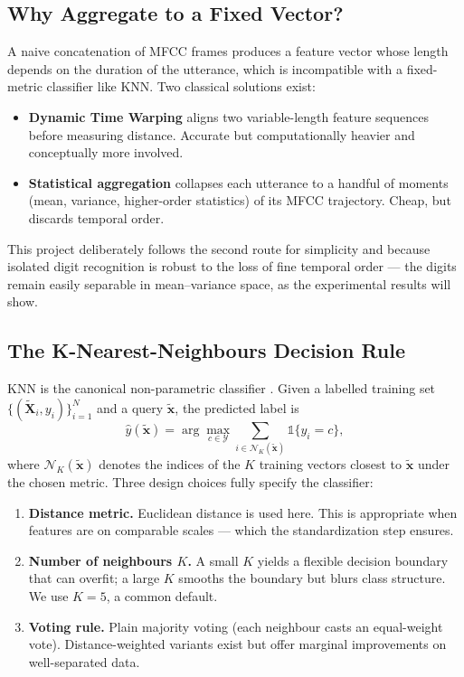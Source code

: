 \documentclass[12pt,a4paper]{article}
\begin{document}
\subsection{Why Aggregate to a Fixed Vector?}

A naive concatenation of MFCC frames produces a feature vector whose length
depends on the duration of the utterance, which is incompatible with a fixed-
metric classifier like KNN. Two classical solutions exist:
\begin{itemize}
    \item \textbf{Dynamic Time Warping} \cite{sakoe1978dynamic} aligns two
          variable-length feature sequences before measuring distance.
          Accurate but computationally heavier and conceptually more involved.
    \item \textbf{Statistical aggregation} collapses each utterance to a
          handful of moments (mean, variance, higher-order statistics) of its
          MFCC trajectory. Cheap, but discards temporal order.
\end{itemize}
This project deliberately follows the second route for simplicity and because
isolated digit recognition is robust to the loss of fine temporal order ---
the digits remain easily separable in mean--variance space, as the
experimental results will show.

\subsection{The K-Nearest-Neighbours Decision Rule}

KNN is the canonical non-parametric classifier \cite{cover1967nearest,fix1951discriminatory,hastie2009elements}. Given a labelled
training set $\{(\tilde{\mathbf{X}}_i, y_i)\}_{i=1}^{N}$ and a query
$\tilde{\mathbf{x}}$, the predicted label is
\begin{equation}
    \hat{y}(\tilde{\mathbf{x}}) = \arg\max_{c \in \mathcal{Y}}
        \sum_{i \in \mathcal{N}_K(\tilde{\mathbf{x}})} \mathbb{1}\{y_i = c\},
\end{equation}
where $\mathcal{N}_K(\tilde{\mathbf{x}})$ denotes the indices of the $K$
training vectors closest to $\tilde{\mathbf{x}}$ under the chosen metric.
Three design choices fully specify the classifier:
\begin{enumerate}
    \item \textbf{Distance metric.} Euclidean distance is used here. This is
          appropriate when features are on comparable scales --- which the
          standardization step ensures.
    \item \textbf{Number of neighbours $K$.} A small $K$ yields a flexible
          decision boundary that can overfit; a large $K$ smooths the
          boundary but blurs class structure. We use $K = 5$, a common
          default.
    \item \textbf{Voting rule.} Plain majority voting (each neighbour casts an
          equal-weight vote). Distance-weighted variants exist
          \cite{hastie2009elements} but offer marginal improvements on
          well-separated data.
\end{enumerate}
\end{document}
